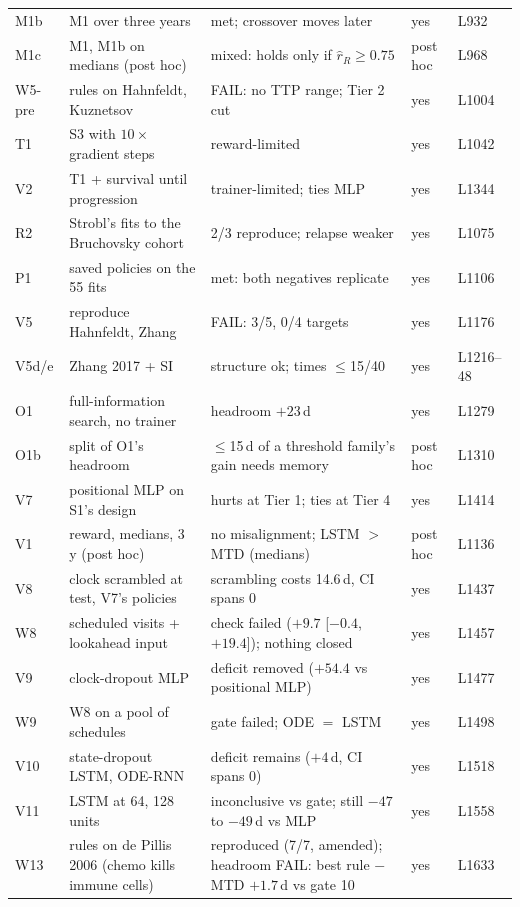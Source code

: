 \documentclass[10pt]{article}
\begin{document}
\begin{table}[h]
{\begin{tabular}{@{}lllll@{}}
M1b & M1 over three years & met; crossover moves later & yes & L932 \\
M1c & M1, M1b on medians (post hoc) & mixed: holds only if $\hat r_R \ge 0.75$ & post hoc & L968 \\
W5-pre & rules on Hahnfeldt, Kuznetsov & FAIL: no TTP range; Tier 2 cut & yes & L1004 \\
T1 & S3 with $10\times$ gradient steps & reward-limited & yes & L1042 \\
V2 & T1 + survival until progression & trainer-limited; ties MLP & yes & L1344 \\
R2 & Strobl's fits to the Bruchovsky cohort & 2/3 reproduce; relapse weaker & yes & L1075 \\
P1 & saved policies on the 55 fits & met: both negatives replicate & yes & L1106 \\
V5 & reproduce Hahnfeldt, Zhang & FAIL: 3/5, 0/4 targets & yes & L1176 \\
V5d/e & Zhang 2017 + SI & structure ok; times $\le$15/40 & yes & L1216--48 \\
O1 & full-information search, no trainer & headroom $+23$\,d & yes & L1279 \\
O1b & split of O1's headroom & $\le$15\,d of a threshold family's gain needs memory & post hoc & L1310 \\
V7 & positional MLP on S1's design & hurts at Tier 1; ties at Tier 4 & yes & L1414 \\
V1 & reward, medians, 3 y (post hoc) & no misalignment; LSTM $>$ MTD (medians) & post hoc & L1136 \\
V8 & clock scrambled at test, V7's policies & scrambling costs 14.6\,d, CI spans 0 & yes & L1437 \\
W8 & scheduled visits + lookahead input & check failed ($+9.7$ [$-0.4$, $+19.4$]); nothing closed & yes & L1457 \\
V9 & clock-dropout MLP & deficit removed ($+54.4$ vs positional MLP) & yes & L1477 \\
W9 & W8 on a pool of schedules & gate failed; ODE $=$ LSTM & yes & L1498 \\
V10 & state-dropout LSTM, ODE-RNN & deficit remains ($+4$\,d, CI spans 0) & yes & L1518 \\
V11 & LSTM at 64, 128 units & inconclusive vs gate; still $-47$ to $-49$\,d vs MLP & yes & L1558 \\
W13 & rules on de Pillis 2006 (chemo kills immune cells) & reproduced (7/7, amended); headroom FAIL: best rule $-$ MTD $+1.7$\,d vs gate 10 & yes & L1633 \\

\end{tabular}}
\end{table}
\end{document}
